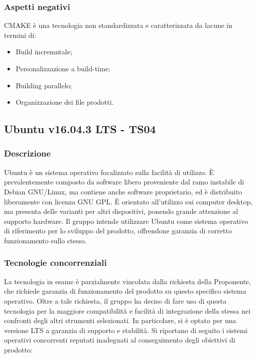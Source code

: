 \documentclass[./../Technology Baseline.tex]{subfiles}
\begin{document}
\subsubsection{Aspetti negativi}
CMAKE è una tecnologia non standardizzata e caratterizzata da lacune in termini di:
\begin{itemize}
	\item Build incremntale;
	\item Personalizzazione a build-time;
	\item Building parallelo;
	\item Organizzazione dei file prodotti.
\end{itemize}

\subsection{Ubuntu v16.04.3 LTS - TS04}

\subsubsection{Descrizione}
Ubuntu è un sistema operativo focalizzato sulla facilità di utilizzo. È prevalentemente composto da software libero proveniente dal ramo instabile di Debian GNU/Linux, ma contiene anche software proprietario, ed è distribuito liberamente con licenza GNU GPL. È orientato all'utilizzo sui computer desktop, ma presenta delle varianti per altri dispositivi, ponendo grande attenzione al supporto hardware. Il gruppo intende utilizzare Ubuntu come sistema operativo di riferimento per lo sviluppo del prodotto, offrendone garanzia di corretto funzionamento sullo stesso.

\subsubsection{Tecnologie concorrenziali}
La tecnologia in esame è parzialmente vincolata dalla richiesta della Proponente, che richiede garanzia di funzionamento del prodotto su questo specifico sistema operativo. Oltre a tale richiesta, il gruppo ha deciso di fare uso di questa tecnologia per la maggiore compatibilità e facilità di integrazione della stessa nei confronti degli altri strumenti selezionati. In particolare, si è optato per una versione LTS a garanzia di supporto e stabilità. Si riportano di seguito i sistemi operativi concorrenti reputati inadeguati al conseguimento degli obiettivi di prodotto:
\end{document}
